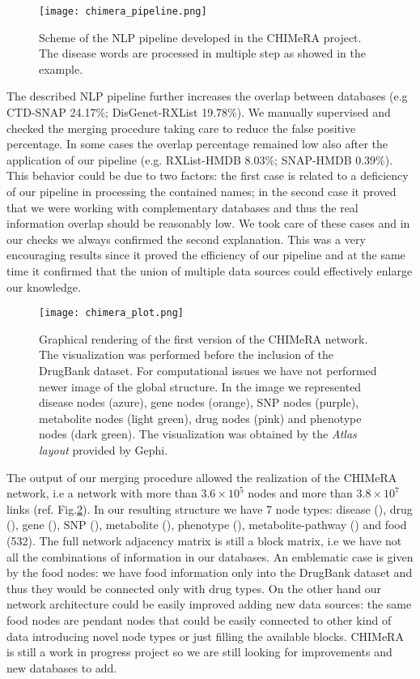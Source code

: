 \documentclass{standalone}
\begin{document}
\begin{figure}[htbp]
\centering
\texttt{[image: chimera\_pipeline.png]}
\caption{Scheme of the NLP pipeline developed in the CHIMeRA project.
The disease words are processed in multiple step as showed in the example.
}
\label{fig:chimera_pipe}
\end{figure}

The described NLP pipeline further increases the overlap between databases (e.g CTD-SNAP 24.17\%; DisGenet-RXList 19.78\%).
We manually supervised and checked the merging procedure taking care to reduce the false positive percentage.
In some cases the overlap percentage remained low also after the application of our pipeline (e.g. RXList-HMDB 8.03\%; SNAP-HMDB 0.39\%).
This behavior could be due to two factors: the first case is related to a deficiency of our pipeline in processing the contained names; in the second case it proved that we were working with complementary databases and thus the real information overlap should be reasonably low.
We took care of these cases and in our checks we always confirmed the second explanation. %
This was a very encouraging results since it proved the efficiency of our pipeline and at the same time it confirmed that the union of multiple data sources could effectively enlarge our knowledge.

\begin{figure}[htbp]
\centering
\texttt{[image: chimera\_plot.png]}
\caption{Graphical rendering of the first version of the CHIMeRA network.
The visualization was performed before the inclusion of the DrugBank dataset.
For computational issues we have not performed newer image of the global structure.
In the image we represented disease nodes (azure), gene nodes (orange), SNP nodes (purple), metabolite nodes (light green), drug nodes (pink) and phenotype nodes (dark green).
The visualization was obtained by the \emph{Atlas layout} provided by \textsf{Gephi}.
}
\label{fig:chimera}
\end{figure}

The output of our merging procedure allowed the realization of the \textsf{CHIMeRA} network, i.e a network with more than $3.6\times10^5$ nodes and more than $3.8\times10^7$ links (ref. Fig.\ref{fig:chimera}).
In our resulting structure we have 7 node types: disease (), drug (), gene (), SNP (), metabolite (), phenotype (), metabolite-pathway () and food (532).
The full network adjacency matrix is still a block matrix, i.e we have not all the combinations of information in our databases.
An emblematic case is given by the food nodes: we have food information only into the DrugBank dataset and thus they would be connected only with drug types.
On the other hand our network architecture could be easily improved adding new data sources: the same food nodes are pendant nodes that could be easily connected to other kind of data introducing novel node types or just filling the available blocks.
\textsf{CHIMeRA} is still a work in progress project so we are still looking for improvements and new databases to add.


\end{document}
